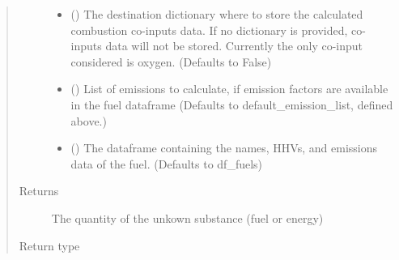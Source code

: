 \documentclass[a4paper,10pt,english]{sphinxmanual}
\begin{document}
\begin{fulllineitems}
\begin{quote}
\begin{description}
\begin{itemize}
\item {} 
 () \textendash{} The destination dictionary where to
store the calculated combustion co-inputs data. If no dictionary
is provided, co-inputs data will not be stored. Currently the only
co-input considered is oxygen.
(Defaults to False)

\item {} 
 (\sphinxstyleliteralemphasis{\sphinxupquote{{[}}}\sphinxstyleliteralemphasis{\sphinxupquote{{]}}}) \textendash{} List of emissions to calculate, if emission
factors are available in the fuel dataframe
(Defaults to default\_emission\_list, defined above.)

\item {} 
 () \textendash{} The dataframe containing the names, HHVs,
and emissions data of the fuel.
(Defaults to df\_fuels)

\end{itemize}

\item[{Returns}] \leavevmode
The quantity of the unkown substance (fuel or energy)

\item[{Return type}] \leavevmode
{}

\end{description}\end{quote}

\end{fulllineitems}

\end{document}

